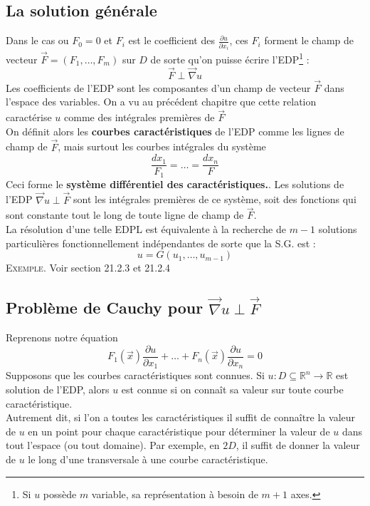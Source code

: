 	\subsection{La solution générale}
	Dans le cas ou $F_0=0$ et $F_i$ est le coefficient des $\frac{\partial u}{
	\partial x_i}$, ces $F_i$ forment le champ de vecteur $\vec{F}=(F_1,\dots,
	F_m)$ sur $D$ de sorte qu'on puisse écrire l'EDP\footnote{Si $u$ possède 
	$m$ variable, sa représentation à besoin de $m+1$ axes.} :
	\begin{equation}
	\vec{F}\perp\vec\nabla u
	\end{equation}
	Les coefficients de l'EDP sont les composantes d'un champ de vecteur 
	$\vec{F}$ dans l'espace des variables. On a vu au précédent chapitre 
	que cette relation caractérise $u$ comme des intégrales premières de 
	$\vec F$\\
	
	On définit alors les \textbf{courbes caractéristiques} de l'EDP comme les 
	lignes de champ de $\vec{F}$, mais surtout les courbes intégrales du 
	système 
	\begin{equation}
	\dfrac{dx_1}{F_1}=\dots=\dfrac{dx_n}{F}
	\end{equation}
	Ceci forme le \textbf{système différentiel des caractéristiques.}. Les 
	solutions de l'EDP $\vec\nabla u \perp\vec{F}$ sont les intégrales 
	premières de ce système, soit des fonctions qui sont constante tout le 
	long de toute ligne de champ de $\vec{F}$.\\
	
	La résolution d'une telle EDPL est équivalente à la recherche de $m-1$ 
	solutions particulières fonctionnellement indépendantes de sorte que 
	la S.G. est :
	\begin{equation}
	u = G(u_1,\dots,u_{m-1})
	\end{equation}
	\textsc{Exemple.} Voir section 21.2.3 et 21.2.4
	
	\setcounter{subsection}{4}
	\subsection{Problème de Cauchy pour $\vec\nabla u \perp \vec F$}
	Reprenons notre équation 
	\begin{equation}
	F_1(\vec{x})\dfrac{\partial u}{\partial x_1}+\dots+F_n(\vec{x})
	\dfrac{\partial u}{\partial x_n}=0
	\end{equation}
	Supposons que les courbes caractéristiques sont connues. Si $u : 
	D\subseteq \mathbb{R}^n\rightarrow\mathbb{R}$ est solution de 
	l'EDP, alors $u$ est connue si on connaît sa valeur sur toute 
	courbe caractéristique.\\
	Autrement dit, si l'on a toutes les caractéristiques il suffit 
	de connaître la valeur de $u$ en un point pour chaque caractéristique 
	pour déterminer la valeur de $u$ dans tout l'espace (ou tout domaine).
	Par exemple, en $2D$, il suffit de donner la valeur de $u$ le long 
	d'une transversale à une courbe caractéristique.\\
	
